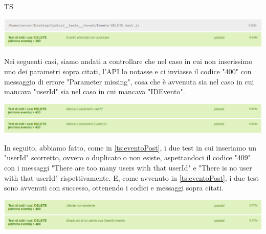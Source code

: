 \begin{listaPersonale}{TS}
                \begin{center}
                        \includegraphics[width=1\textwidth, height=0.08\textheight]{img/png/tests/EventoDelete/200_DeleteEvento.png}
                \end{center}
                Nei seguenti casi, siamo andati a controllare che nel caso in cui non inserissimo uno dei parametri sopra citati, l'API lo notasse e ci inviasse il codice "400" con messaggio di errore "Parameter missing", cosa che è avvenuta sia nel caso in cui mancava "userId" sia nel caso in cui mancava "IDEvento".
                \begin{center}
                        \includegraphics[width=1\textwidth, height=0.08\textheight]{img/png/tests/EventoDelete/400_missingParameter_deleteEvento.png}
                \end{center}
                In seguito, abbiamo fatto, come in \ref{ts:eventoPost}, i due test in cui inseriamo un "userId" scorretto, ovvero o duplicato o non esiste, aspettandoci il codice "409" con i messaggi "There are too many users with that userId" e "There is no user with that userId" rispettivamente. E, come avvenuto in \ref{ts:eventoPost}, i due test sono avvenuti con successo, ottenendo i codici e messaggi sopra citati.
                \begin{center}
                        \includegraphics[width=1\textwidth, height=0.08\textheight]{img/png/tests/EventoDelete/409_userId_DeleteEvento.png}

\end{center}
\end{listaPersonale}
